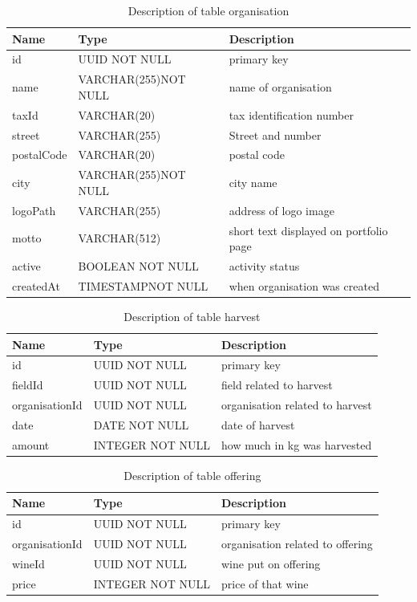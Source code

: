 \begin{table}[th]
	\centering
	\caption{Description of table organisation}
	\begin{tabular}{|m{}|m{}|m{}|}
		\hline
		Name & Type & Description  \\
		\hline
		id & UUID NOT NULL & primary key \\
		\hline
		name & VARCHAR(255)\newline NOT NULL & name of organisation \\
		\hline
		taxId & VARCHAR(20) & tax identification number \\
		\hline
		street & VARCHAR(255) & Street and number\\
		\hline
		postalCode & VARCHAR(20) & postal code \\
		\hline
		city & VARCHAR(255)\newline NOT NULL & city name\\
		\hline
		logoPath & VARCHAR(255) & address of logo image \\
		\hline
		motto & VARCHAR(512) & short text displayed on portfolio page \\
		\hline
		active & BOOLEAN NOT NULL & activity status \\
		\hline
		createdAt & TIMESTAMP\newline NOT NULL & when organisation was created \\
		\hline
	\end{tabular}
\end{table}
\begin{table}[th]
	\centering
	\caption{Description of table harvest}
	\begin{tabular}{|m{}|m{}|m{}|}
		\hline
		Name & Type & Description  \\
		\hline
		id & UUID NOT NULL & primary key \\
		\hline
		fieldId & UUID NOT NULL & field related to harvest \\
		\hline
		organisationId & UUID NOT NULL & organisation related to harvest \\
		\hline
		date & DATE NOT NULL & date of harvest \\
		\hline
		amount & INTEGER NOT NULL & how much in kg was harvested \\
		\hline
	\end{tabular}
\end{table}
\begin{table}[th]
	\centering
	\caption{Description of table offering}
	\begin{tabular}{|m{}|m{}|m{}|}
		\hline
		Name & Type & Description \\
		\hline
		id & UUID NOT NULL & primary key \\
		\hline
		organisationId & UUID NOT NULL & organisation related to offering \\
		\hline
		wineId & UUID NOT NULL & wine put on offering \\
		\hline
		price & INTEGER NOT NULL & price of that wine \\
		\hline
	\end{tabular}
\end{table}
